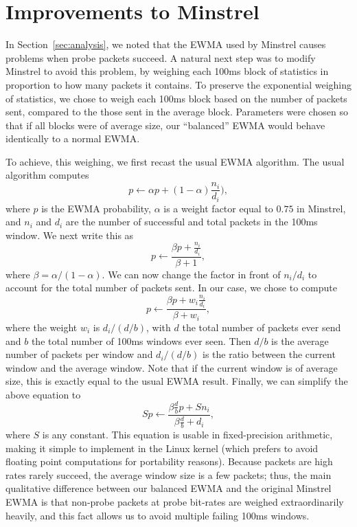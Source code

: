 \documentclass[letterpaper,twocolumn,10pt]{article}
\begin{document}
\section{Improvements to Minstrel}

In Section~\ref{sec:analysis}, we noted that the EWMA used by Minstrel
causes problems when probe packets succeed.  A natural next step was
to modify Minstrel to avoid this problem, by weighing each 100ms block
of statistics in proportion to how many packets it contains.  To
preserve the exponential weighing of statistics, we chose to weigh
each 100ms block based on the number of packets sent, compared to the
those sent in the average block.  Parameters were chosen so that if
all blocks were of average size, our ``balanced'' EWMA would behave
identically to a normal EWMA.

To achieve, this weighing, we first recast the usual EWMA algorithm.
The usual algorithm computes $$p \gets \alpha p + (1 - \alpha)
\frac{n_i}{d_i}),$$ where $p$ is the EWMA probability, $\alpha$ is a
weight factor equal to $0.75$ in Minstrel, and $n_i$ and $d_i$ are the
number of successful and total packets in the 100ms window.  We next
write this as $$p \gets \frac{\beta p + \frac{n_i}{d_i}}{\beta + 1},$$
where $\beta = \alpha / (1 - \alpha)$.  We can now change the factor
in front of $n_i / d_i$ to account for the total number of packets
sent.  In our case, we chose to compute $$p \gets \frac{\beta p + w_i
  \frac{n_i}{d_i}}{\beta + w_i},$$ where the weight $w_i$ is $d_i / (d
/ b)$, with $d$ the total number of packets ever send and $b$ the
total number of 100ms windows ever seen.  Then $d / b$ is the average
number of packets per window and $d_i / (d / b)$ is the ratio between
the current window and the average window.  Note that if the current
window is of average size, this is exactly equal to the usual EWMA
result.  Finally, we can simplify the above equation to $$S p \gets
\frac{\beta \frac{d}{b} p + S n_i}{\beta \frac{d}{b} + d_i},$$ where
$S$ is any constant.  This equation is usable in fixed-precision
arithmetic, making it simple to implement in the Linux kernel (which
prefers to avoid floating point computations for portability reasons).
Because packets are high rates rarely succeed, the average window size
is a few packets; thus, the main qualitative difference between our
balanced EWMA and the original Minstrel EWMA is that non-probe packets
at probe bit-rates are weighed extraordinarily heavily, and this fact
allows us to avoid multiple failing 100ms windows.
\end{document}
